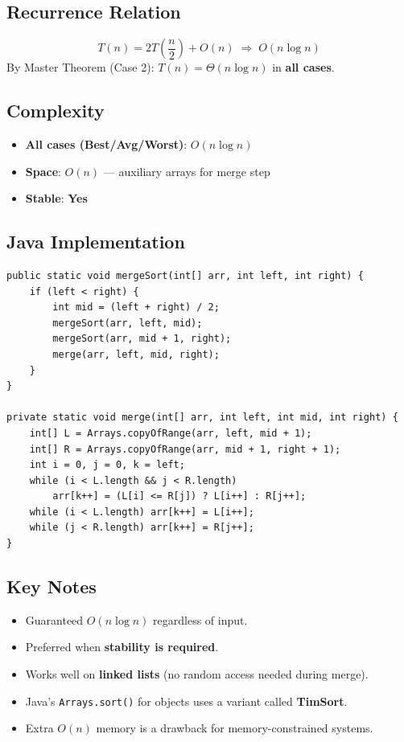 \documentclass[12pt,a4paper]{article}
\begin{document}
\subsection{Recurrence Relation}
\[
T(n) = 2T\!\left(\frac{n}{2}\right) + O(n) \;\Rightarrow\; O(n \log n)
\]
By Master Theorem (Case 2): $T(n) = \Theta(n \log n)$ in \textbf{all cases}.

\subsection{Complexity}
\begin{itemize}
    \item \textbf{All cases (Best/Avg/Worst)}: $O(n \log n)$
    \item \textbf{Space}: $O(n)$ — auxiliary arrays for merge step
    \item \textbf{Stable}: \textbf{Yes}
\end{itemize}

\subsection{Java Implementation}
\begin{lstlisting}[style=javastyle, caption={Merge Sort — Java}]
public static void mergeSort(int[] arr, int left, int right) {
    if (left < right) {
        int mid = (left + right) / 2;
        mergeSort(arr, left, mid);
        mergeSort(arr, mid + 1, right);
        merge(arr, left, mid, right);
    }
}

private static void merge(int[] arr, int left, int mid, int right) {
    int[] L = Arrays.copyOfRange(arr, left, mid + 1);
    int[] R = Arrays.copyOfRange(arr, mid + 1, right + 1);
    int i = 0, j = 0, k = left;
    while (i < L.length && j < R.length)
        arr[k++] = (L[i] <= R[j]) ? L[i++] : R[j++];
    while (i < L.length) arr[k++] = L[i++];
    while (j < R.length) arr[k++] = R[j++];
}
\end{lstlisting}

\subsection{Key Notes}
\begin{itemize}
    \item Guaranteed $O(n \log n)$ regardless of input.
    \item Preferred when \textbf{stability is required}.
    \item Works well on \textbf{linked lists} (no random access needed during merge).
    \item Java's \texttt{Arrays.sort()} for objects uses a variant called \textbf{TimSort}.
    \item Extra $O(n)$ memory is a drawback for memory-constrained systems.
\end{itemize}
\end{document}
